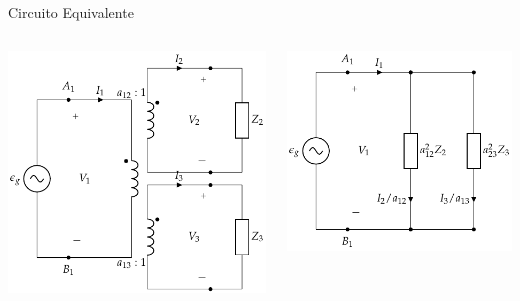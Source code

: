 \documentclass[xcolor={usenames,svgnames,dvipsnames}]{beamer}
\begin{document}
\begin{frame}[label={sec:org4b54d05}]{Circuito Equivalente}
\begin{columns}
\begin{column}{0.5\columnwidth}
\begin{center}
\includegraphics[width=.9\linewidth]{../figs/TrafoIdealVariosDevanados_Impedancia.pdf}
\end{center}
\end{column}

\begin{column}{0.5\columnwidth}
\begin{center}
\includegraphics[width=.9\linewidth]{../figs/TrafoIdealVariosDevanados_Impedancia_Equivalente.pdf}
\end{center}
\end{column}
\end{columns}
\end{frame}
\end{document}
